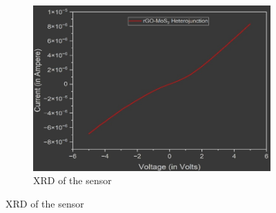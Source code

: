 \documentclass[11pt,a5paper]{article}
\begin{document}
\begin{figure}[t]
\begin{subfigure}[b]{0.325\textwidth}
        \includegraphics[width=\linewidth]{elec_char.png}
        \caption{XRD of the sensor}
    \end{subfigure}

    \vspace{0.5cm}


\end{figure}
\end{document}
